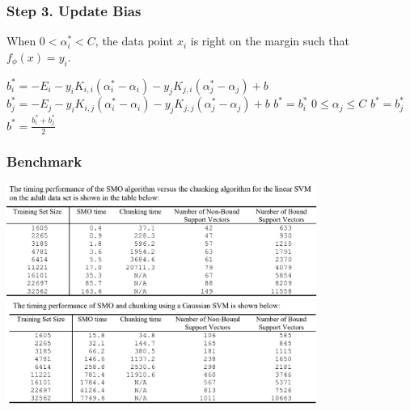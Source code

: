 \documentclass[xcolor=pdftex,dvipsnames,table,handout]{beamer}
\begin{document}
\begin{frame}  
\frametitle{Step 3. Update Bias}
When $0 \lt \alpha_i^* \lt C$, the data point $x_i$ is right on the margin such that $f_{\phi}(x)=y_i$.

\begin{algorithmic}
\State $b_i^* = - E_i - y_i K_{i, i} (\alpha_i^* - \alpha_i) - y_j K_{j, i} (\alpha_j^* - \alpha_j) + b$
\State $b_j^* = - E_j - y_i K_{i, j} (\alpha_i^* - \alpha_i) - y_j K_{j, j} (\alpha_j^* - \alpha_j) + b$
    \State $b^* = b_i^*$
\ElsIf $0 \leq \alpha_j \leq C$
    \State $b^* = b_j^*$
\Else
    \State $b^* = \frac{b_i^* + b_j^*}{2}$
\end{algorithmic}





    

\end{frame}

\begin{frame}  
\frametitle{Benchmark}
\begin{center}
    \includegraphics[width=4in]{./imgs/linear_svm.png}
    \includegraphics[width=4in]{./imgs/gaussian_svm.png}
\end{center}
\end{frame}
\end{document}
